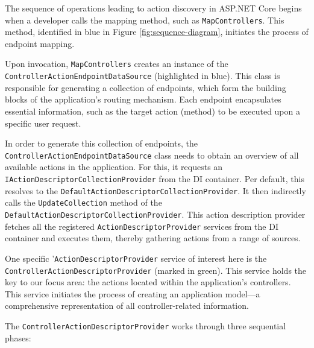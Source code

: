 The sequence of operations leading to action discovery in ASP.NET Core begins when a developer calls the mapping method, such as \verb|MapControllers|. This method, identified in blue in Figure \ref{fig:sequence-diagram}, initiates the process of endpoint mapping.

Upon invocation, \verb|MapControllers| creates an instance of the \verb|ControllerActionEndpointDataSource| (highlighted in blue). This class is responsible for generating a collection of endpoints, which form the building blocks of the application's routing mechanism. Each endpoint encapsulates essential information, such as the target action (method) to be executed upon a specific user request.

In order to generate this collection of endpoints, the \verb|ControllerActionEndpointDataSource| class needs to obtain an overview of all available actions in the application. For this, it requests an \verb|IActionDescriptorCollectionProvider| from the DI container. Per default, this resolves to the \verb|DefaultActionDescriptorCollectionProvider|. It then indirectly calls the \verb|UpdateCollection| method of the \verb|DefaultActionDescriptorCollectionProvider|. This action description provider fetches all the registered \verb|ActionDescriptorProvider| services from the DI container and executes them, thereby gathering actions from a range of sources.

One specific '\verb|ActionDescriptorProvider| service of interest here is the \verb|ControllerActionDescriptorProvider| (marked in green). This service holds the key to our focus area: the actions located within the application's controllers. This service initiates the process of creating an application model—a comprehensive representation of all controller-related information.

The \verb|ControllerActionDescriptorProvider| works through three sequential phases:

